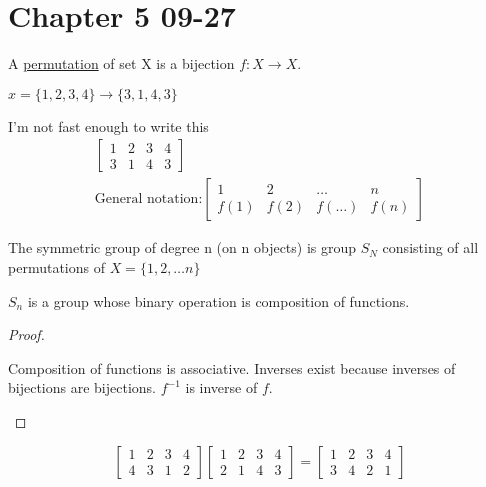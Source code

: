 \documentclass[11pt]{scrartcl}
\begin{document}
\section{Chapter 5 09-27}

\begin{definition}
  A \ul{permutation} of set X is a bijection $f:X \to X$.
\end{definition}

\begin{example}
  $x = \{1, 2, 3, 4\} \to \{3, 1, 4, 3\}$
\end{example}

I'm not fast enough to write this
\begin{gather*}
  \begin{bmatrix}
    1 & 2 & 3 & 4 \\
    3 & 1 & 4 & 3
  \end{bmatrix} \\
  \text{General notation:}
  \begin{bmatrix}
    1 & 2 & \dots & n \\
    f(1) & f(2) & f(\dots) & f(n)
  \end{bmatrix}
\end{gather*}

\begin{definition}
  The symmetric group of degree n (on n objects) is group $S_N$ consisting of all permutations of $X = \{1, 2, \dots n\}$
\end{definition}

\begin{theorem}
  $S_n$ is a group whose binary operation is composition of functions.
\end{theorem}

\begin{proof}
  \begin{enumerate}
    \ii[]
    \ii
    Composition of functions is associative.
    \ii
    Inverses exist because inverses of bijections are bijections. $f^{-1}$ is inverse of $f$.
  \end{enumerate}
\end{proof}

\begin{example}
  \[
    \begin{bmatrix}
      1 & 2 & 3 & 4 \\
      4 & 3 & 1 & 2
    \end{bmatrix} 
    \begin{bmatrix}
      1 & 2 & 3 & 4 \\
      2 & 1 & 4 & 3
    \end{bmatrix} =
    \begin{bmatrix}
      1 & 2 & 3 & 4 \\
      3 & 4 & 2 & 1
    \end{bmatrix}
  \]
\end{example}
\end{document}
